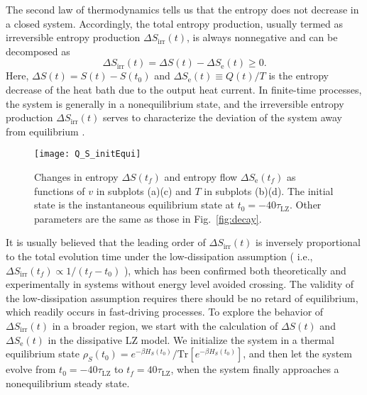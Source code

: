 \documentclass[english,nofootinbib, pra, twocolumn,superscriptaddress]{revtex4-1}
\begin{document}
The second law of thermodynamics tells us that the entropy does not decrease
in a closed system. Accordingly, the total
entropy production, usually termed as irreversible entropy production
$\Delta S_{\text{irr}}(t)$, is always nonnegative and can be decomposed as
\begin{equation}
\Delta S_{\text{irr}}(t)=\Delta S(t)-\Delta S_{\text{e}}(t)\geq0.\label{eq:Sirr}
\end{equation}
Here, $\Delta S(t)=S(t)-S(t_{0})$ and $\Delta S_{\text{e}}(t)\equiv Q(t)/T$
is the entropy decrease of the heat bath due to the output heat current.
In finite-time processes, the system is generally in
a nonequilibrium state, and the irreversible entropy production
$\Delta S_{\text{irr}}(t)$ serves to characterize the deviation of
the system away from equilibrium \citep{2009.Jarzynski,2011.Broeck}.

\begin{figure*}
\texttt{[image: Q\_S\_initEqui]}\caption{Changes in entropy $\Delta S(t_{f})$ and entropy flow $\Delta S_{\text{e}}(t_{f})$ as functions of $v$ in subplots (a)(c) and $T$ in subplots (b)(d).
The initial state is the instantaneous equilibrium state at $t_{0}=-40\tau_{\text{LZ}}$. Other parameters are the same as those in Fig.~\ref{fig:decay}.}
\label{fig:QandS}
\end{figure*}

It is usually believed that the leading order of $\Delta S_{\text{irr}}(t)$
is inversely proportional to the total evolution time under the low-dissipation assumption ( 
i.e., $\Delta S_{\text{irr}}(t_{f})\propto1/(t_{f}-t_{0})$
\citep{2010.Broeck}), which has been confirmed both theoretically \citep{2017.Giovannetti,2018.Xu}
and experimentally \citep{2020.Dong} in systems without energy
level avoided crossing. The validity of the low-dissipation assumption
requires there should be no retard of equilibrium, which readily occurs in fast-driving processes. To explore the behavior
of $\Delta S_{\text{irr}}(t)$ in a broader region, we start with
the calculation of $\Delta S(t)$ and $\Delta S_{\text{e}}(t)$ in
the dissipative LZ model. We initialize the system in a thermal equilibrium
state $\rho_{S}(t_{0})=e^{-\beta H_{S}(t_{0})}/\text{Tr}[e^{-\beta H_{S}(t_{0})}]$,
and then let the system evolve from $t_{0}=-40\tau_{\text{LZ}}$ to
$t_{f}=40\tau_{\text{LZ}}$, when the system finally approaches a
nonequilibrium steady state.
\end{document}
